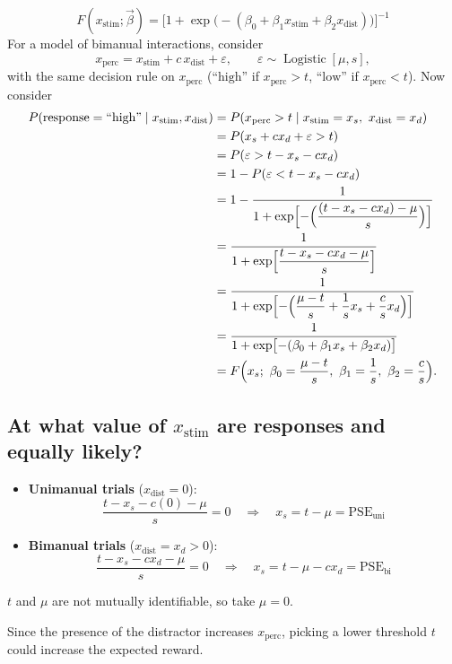 \documentclass[11pt]{article}
\newcommand{\xs}{x_{\text{stim}}}
\newcommand{\xd}{x_{\text{dist}}}
\newcommand{\xp}{x_{\text{perc}}}
\newcommand{\PSEuni}{\mathrm{PSE}_{\text{uni}}}
\newcommand{\PSEbi}{\mathrm{PSE}_{\text{bi}}}
\newcommand{\high}{\text{``high''}}
\newcommand{\low}{\text{``low''}}
\newcommand{\bvec}{\vec{\beta}}
\begin{document}
\[
  F(\xs; \bvec) = \bigl[1+\exp\bigl(-(\beta_0+\beta_1\xs+\beta_2\xd)\bigr)\bigr]^{-1}
\]
For a model of bimanual interactions, consider
\[
  \xp = \xs + c\,\xd + \varepsilon, \qquad \varepsilon \sim \operatorname{Logistic}[\mu,s],
\]
with the same decision rule on $\xp$ ($\high$ if $\xp > t$, $\low$ if $\xp < t$).
Now consider
\begin{align*}
  P(\text{response} = \high \mid \xs, \xd)
  &= P(\xp > t \mid \xs = x_s,\ \xd = x_d)\\
  &= P(x_s + c x_d + \varepsilon > t)\\
  &= P(\varepsilon > t - x_s - c x_d)\\
  &= 1 - P(\varepsilon < t - x_s - c x_d)\\
  &= 1 - \frac{1}{1+\exp\Bigl[-\Bigl(\dfrac{(t-x_s-c x_d)-\mu}{s}\Bigr)\Bigr]}\\
  &= \frac{1}{1+\exp\Bigl[\dfrac{t-x_s-c x_d-\mu}{s}\Bigr]}\\
  &= \frac{1}{1+\exp\Bigl[-\Bigl(\dfrac{\mu-t}{s}+\dfrac{1}{s}x_s+\dfrac{c}{s}x_d\Bigr)\Bigr]}\\
  &= \frac{1}{1+\exp\bigl[-(\beta_0+\beta_1 x_s+\beta_2 x_d)\bigr]}\\
  &= F\Bigl(x_s;\ \beta_0 = \frac{\mu-t}{s},\ \beta_1 = \frac{1}{s},\ \beta_2 = \frac{c}{s}\Bigr).
\end{align*}

\subsection*{At what value of $\xs$ are responses \high{} and \low{} equally likely?}

\begin{itemize}
  \item \textbf{Unimanual trials} ($\xd = 0$):
  \[
    \frac{t - x_s - c(0) - \mu}{s} = 0
    \quad\Longrightarrow\quad
    x_s = t-\mu = \PSEuni
  \]
  \item \textbf{Bimanual trials} ($\xd = x_d > 0$):
  \[
    \frac{t - x_s - c x_d - \mu}{s} = 0
    \quad\Longrightarrow\quad
    x_s = t-\mu-c x_d = \PSEbi
  \]
\end{itemize}
$t$ and $\mu$ are not mutually identifiable, so take $\mu = 0$.

\begin{aside}
Since the presence of the distractor increases $\xp$, picking a lower threshold $t$
could increase the expected reward.
\end{aside}

\end{document}
